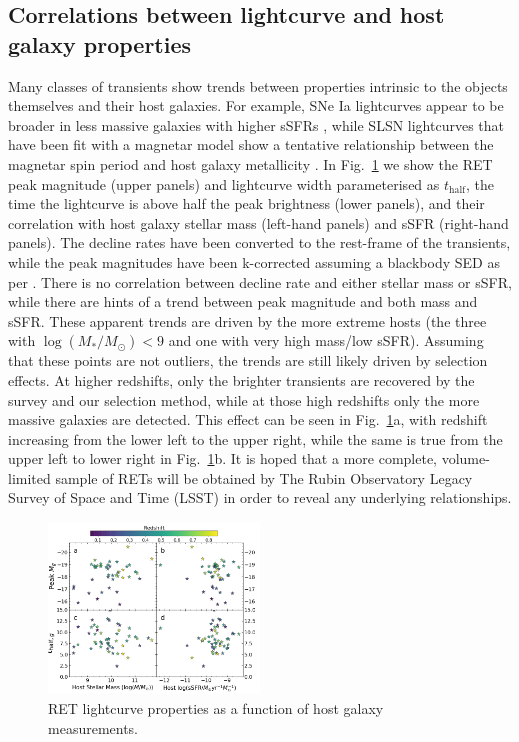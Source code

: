 \documentclass[fleqn,usenatbib,]{mnras}
\newcommand{\replyref}[1]{\color{magenta}#1 \color{black}}
\begin{document}
\subsection{Correlations between lightcurve and host galaxy properties \label{subsec:disc_correlations}}
Many classes of transients show trends between properties intrinsic to the objects themselves and their host galaxies. For example, SNe Ia lightcurves appear to be broader in less massive galaxies with higher sSFRs \citep{Sullivan2006,Neill2009,Howell2009,Sullivan2010,Roman2018,Kelsey2020}, while SLSN lightcurves that have been fit with a magnetar model show a tentative relationship between the magnetar spin period and host galaxy metallicity \citep{Chen2016a}. In Fig.~\ref{fig:ret_v_host} we show the RET peak magnitude (upper panels) and lightcurve width parameterised as $t_{\mathrm{half}}$, the time the lightcurve is above half the peak brightness (lower panels), and their correlation with host galaxy stellar mass (left-hand panels) and sSFR (right-hand panels). The decline rates have been converted to the rest-frame of the transients, while the peak magnitudes have been k-corrected assuming a blackbody SED \replyref{as per }. There is no correlation between decline rate and either stellar mass or sSFR, while there are hints of a trend between peak magnitude and both mass and sSFR. These apparent trends are driven by the more extreme hosts (the three with $\log\left(M_*/M_{\odot}\right) < 9$ and one with very high mass/low sSFR). Assuming that these points are not outliers, the trends are still likely driven by selection effects. At higher redshifts, only the brighter transients are recovered by the survey and our selection method, while at those high redshifts only the more massive galaxies are detected. This effect can be seen in Fig.~\ref{fig:ret_v_host}a, with redshift increasing from the lower left to the upper right, while the same is true from the upper left to lower right in Fig.~\ref{fig:ret_v_host}b. It is hoped that a more complete, volume-limited sample of RETs will be obtained by The Rubin Observatory Legacy Survey of Space and Time (LSST) in order to reveal any underlying relationships.

\label{sec:disc}
\begin{figure}
\includegraphics[width=0.5\textwidth]{figs/RET_vs_host.png}
\caption{RET lightcurve properties as a function of host galaxy measurements.
\label{fig:ret_v_host}}
\end{figure}
\end{document}
